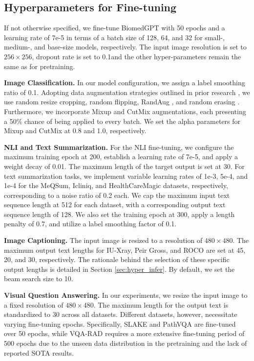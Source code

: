 \documentclass[10pt]{article} \usepackage[preprint]{tmlr}
\begin{document}
\subsection{Hyperparameters for Fine-tuning} 
If not otherwise specified, we fine-tune BiomedGPT with 50 epochs and a learning rate of 7e-5 in terms of a batch size of 128, 64, and 32 for small-, medium-, and base-size models, respectively. The input image resolution is set to $256 \times 256$, dropout \citep{srivastava2014dropout} rate is set to 0.1and the other hyper-parameters remain the same as for pretraining. 

\vspace{5pt}
\noindent \textbf{Image Classification.} In our model configuration, we assign a label smoothing \citep{szegedy2016rethinking} ratio of 0.1. Adopting data augmentation strategies outlined in prior research \cite{wang2022ofa, bao2021beit}, we use random resize cropping, random flipping, RandAug \citep{cubuk2020randaugment}, and random erasing \citep{zhong2020random}. Furthermore, we incorporate Mixup \cite{zhang2018mixup} and CutMix \citep{yun2019cutmix} augmentations, each presenting a 50\% chance of being applied to every batch. We set the alpha parameters for Mixup and CutMix at 0.8 and 1.0, respectively.

\vspace{5pt}
\noindent \textbf{NLI and Text Summarization.} For the NLI fine-tuning, we configure the maximum training epoch at 200, establish a learning rate of 7e-5, and apply a weight decay of 0.01. The maximum length of the target output is set at 30. For text summarization tasks, we implement variable learning rates of 1e-3, 5e-4, and 1e-4 for the MeQSum, Icliniq, and HealthCareMagic datasets, respectively, corresponding to a noise ratio of 0.2 each. We cap the maximum input text sequence length at 512 for each dataset, with a corresponding output text sequence length of 128. We also set the training epoch at 300, apply a length penalty of 0.7, and utilize a label smoothing factor of 0.1.

\vspace{5pt}
\noindent \textbf{Image Captioning.} The input image is resized to a resolution of $480 \times 480$. The maximum output text lengths for IU-Xray, Peir Gross, and ROCO are set at 45, 20, and 30, respectively. The rationale behind the selection of these specific output lengths is detailed in Section \ref{sec:hyper_infer}. By default, we set the beam search size to 10.

\vspace{5pt}
\noindent \textbf{Visual Question Answering.} In our experiments, we resize the input image to a fixed resolution of $480 \times 480$. The maximum length for the output text is standardized to 30 across all datasets. Different datasets, however, necessitate varying fine-tuning epochs. Specifically, SLAKE and PathVQA are fine-tuned over 50 epochs, while VQA-RAD requires a more extensive fine-tuning period of 500 epochs due to the unseen data distribution in the pretraining and the lack of reported SOTA results.
\end{document}
